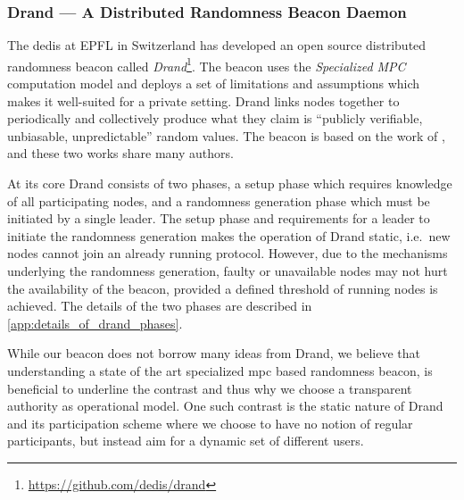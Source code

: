 \subsubsection{Drand --- A Distributed Randomness Beacon Daemon}%
\label{sub:drand_a_distributed_randomness_beacon_daemon}
The \gls{dedis} at EPFL in Switzerland has developed an open source distributed randomness beacon called \textit{Drand}\footnote{\url{https://github.com/dedis/drand}}.
The beacon uses the \textit{Specialized MPC} computation model and deploys a set of limitations and assumptions which makes it well-suited for a private setting.
Drand links nodes together to periodically and collectively produce what they claim is \enquote{publicly verifiable, unbiasable, unpredictable} random values.
The beacon is based on the work of \citet{syta2017scalable}, and these two works share many authors.

At its core Drand consists of two phases, a setup phase which requires knowledge of all participating nodes, and a randomness generation phase which must be initiated by a single leader.
The setup phase and requirements for a leader to initiate the randomness generation makes the operation of Drand static, i.e.\ new nodes cannot join an already running protocol.
However, due to the mechanisms underlying the randomness generation, faulty or unavailable nodes may not hurt the availability of the beacon, provided a defined threshold of running nodes is achieved.
The details of the two phases are described in \vref{app:details_of_drand_phases}.

While our beacon does not borrow many ideas from Drand, we believe that understanding a state of the art specialized \gls{mpc} based randomness beacon, is beneficial to underline the contrast and thus why we choose a transparent authority as operational model.
One such contrast is the static nature of Drand and its participation scheme where we choose to have no notion of regular participants, but instead aim for a dynamic set of different users.


